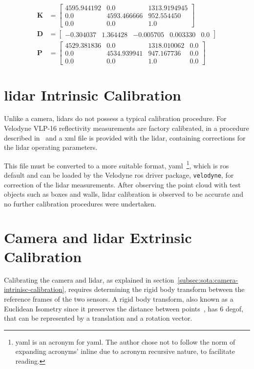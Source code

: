 \begin{subequations}
	\label{eq:camera-calibration-results}
	\begin{align}
		\mathbf{K} & = 
		\begin{bmatrix}
			4595.944192 & 0.0         &  1313.9194945 \\
			0.0         & 4593.466666 &  952.554450 \\
			0.0         & 0.0         &  1.0
		\end{bmatrix} \nonumber \\
		\mathbf{D} & = 
		\begin{bmatrix}
			-0.304037 & 1.364428 &  -0.005705 & 0.003330 & 0.0
		\end{bmatrix} \nonumber \\
		\mathbf{P} & = 
		\begin{bmatrix}
			4529.381836 & 0.0         & 1318.010062 & 0.0 \\
			0.0         & 4534.939941 & 947.167736  & 0.0 \\
			0.0         & 0.0         & 1.0         & 0.0 
		\end{bmatrix}
		\nonumber
	\end{align}
\end{subequations}

	

\section{\ac{lidar} Intrinsic Calibration}
Unlike a camera, \acp{lidar} do not possess a typical calibration procedure. For Velodyne VLP-16 reflectivity measurements are factory calibrated, in a procedure described in~\cite{vlp16} and a \ac{xml} file is provided with the \ac{lidar}, containing corrections for the \ac{lidar} operating parameters.

This file must be converted to a more suitable format, \acs{yaml}~\footnote{\acs{yaml} is an acronym for \acl{yaml}. The author chose not to follow the norm of expanding acronyms' inline due to acronym recursive nature, to facilitate reading.}, which is \ac{ros} default and can be loaded by the Velodyne \ac{ros} driver package, \texttt{velodyne}, for correction of the \ac{lidar} measurements. After observing the point cloud with test objects such as boxes and walls, \ac{lidar} calibration is observed to be accurate and no further calibration procedures were undertaken.

\section{Camera and \ac{lidar} Extrinsic Calibration}
\label{sec:calibration:extrinsic}
Calibrating the camera and \ac{lidar}, as explained in section~\ref{subsec:sota:camera-intrinisc-calibration}, requires determining the rigid body transform between the reference frames of the two sensors. A rigid body transform, also known as a Euclidean Isometry since it preserves the distance between points~\cite{mvg_book}, has 6 \ac{degof}, that can be represented by a translation and a rotation vector.

